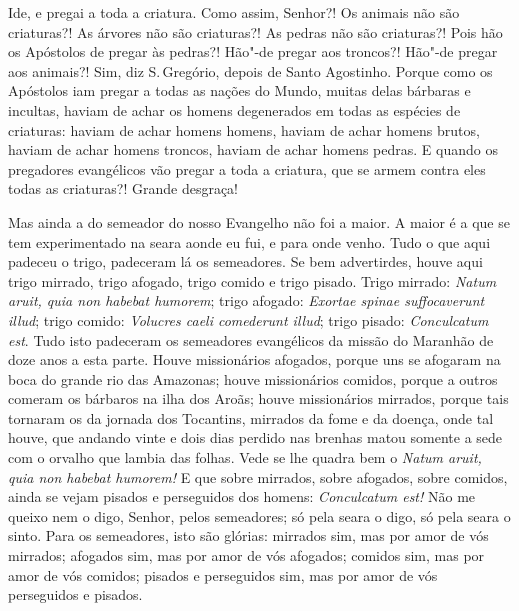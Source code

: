 Ide, e pregai a toda a criatura. Como assim, Senhor?! Os animais não
são criaturas?! As árvores não são criaturas?! As pedras não são
criaturas?! Pois hão os Apóstolos de pregar às pedras?! Hão"-de pregar
aos troncos?! Hão"-de pregar aos animais?! Sim, diz S.\,Gregório, depois
de Santo Agostinho. Porque como os Apóstolos iam pregar a todas as
nações do Mundo, muitas delas bárbaras e incultas, haviam de achar os
homens degenerados em todas as espécies de criaturas: haviam de achar
homens homens, haviam de achar homens brutos, haviam de achar homens
troncos, haviam de achar homens pedras. E quando os pregadores evangélicos vão pregar a toda a criatura, que se armem contra eles todas as
criaturas?! Grande desgraça!

Mas ainda a do semeador do nosso Evangelho não foi a maior. A maior é a
que se tem experimentado na seara aonde eu fui, e para onde venho. Tudo
o que aqui padeceu o trigo, padeceram lá os semeadores. Se bem
advertirdes, houve aqui trigo mirrado, trigo afogado, trigo comido e
trigo pisado. Trigo mirrado: \emph{Natum aruit, quia non habebat
humorem}; trigo afogado: \emph{Exortae spinae suffocaverunt illud};
trigo comido: \emph{Volucres caeli comederunt illud}; trigo pisado:
\emph{Conculcatum est}. Tudo isto padeceram os semeadores evangélicos
da missão do Maranhão de doze anos a esta parte. Houve missionários
afogados, porque uns se afogaram na boca do grande rio das Amazonas;
houve missionários comidos, porque a outros comeram os bárbaros na ilha
dos Aroãs; houve missionários mirrados, porque tais tornaram os da
jornada dos Tocantins, mirrados da fome e da doença, onde tal houve, que
andando vinte e dois dias perdido nas brenhas matou somente a sede com o
orvalho que lambia das folhas. Vede se lhe quadra bem o \emph{Natum
aruit, quia non habebat humorem!} E que sobre mirrados, sobre
afogados, sobre comidos, ainda se vejam pisados e perseguidos dos
homens: \emph{Conculcatum est!} Não me queixo nem o digo, Senhor, pelos
semeadores; só pela seara o digo, só pela seara o sinto. Para os
semeadores, isto são glórias: mirrados sim, mas por amor de vós
mirrados; afogados sim, mas por amor de vós
afogados; comidos sim, mas por amor de vós comidos; pisados e
perseguidos sim, mas por amor de vós perseguidos e pisados.

